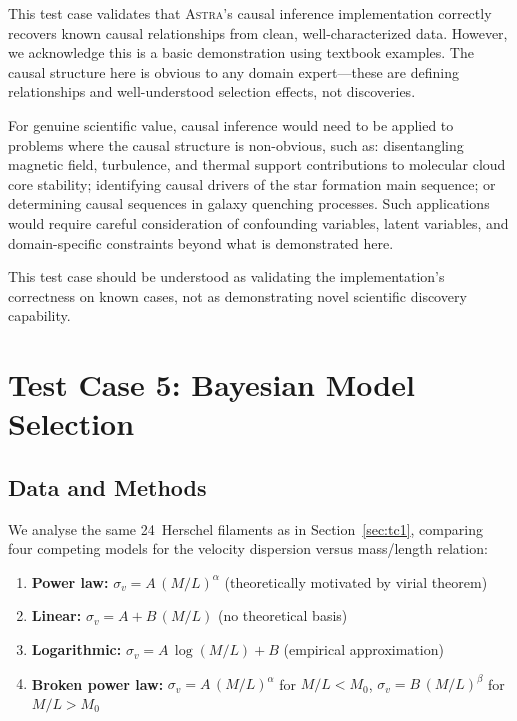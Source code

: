 \documentclass[fleqn,usenatbib]{mnras}
\newcommand{\astra}{\textsc{Astra}\xspace}
\begin{document}
This test case validates that \astra's causal inference implementation correctly recovers known causal relationships from clean, well-characterized data.
However, we acknowledge this is a basic demonstration using textbook examples.
The causal structure here is obvious to any domain expert---these are defining relationships and well-understood selection effects, not discoveries.

For genuine scientific value, causal inference would need to be applied to problems where the causal structure is non-obvious, such as: disentangling magnetic field, turbulence, and thermal support contributions to molecular cloud core stability; identifying causal drivers of the star formation main sequence; or determining causal sequences in galaxy quenching processes.
Such applications would require careful consideration of confounding variables, latent variables, and domain-specific constraints beyond what is demonstrated here.

This test case should be understood as validating the implementation's correctness on known cases, not as demonstrating novel scientific discovery capability.

\section{Test Case 5: Bayesian Model Selection}
\label{sec:tc5}

\subsection{Data and Methods}
\label{sec:tc5:data}

We analyse the same 24~Herschel filaments as in Section~\ref{sec:tc1}, comparing four competing models for the velocity dispersion versus mass/length relation:
\begin{enumerate}
  \item[(i)] \textbf{Power law:} $\sigma_v = A\,(M/L)^{\alpha}$ (theoretically motivated by virial theorem)
  \item[(ii)] \textbf{Linear:} $\sigma_v = A + B\,(M/L)$ (no theoretical basis)
  \item[(iii)] \textbf{Logarithmic:} $\sigma_v = A\,\log(M/L) + B$ (empirical approximation)
  \item[(iv)] \textbf{Broken power law:} $\sigma_v = A\,(M/L)^{\alpha}$ for $M/L < M_0$, $\sigma_v = B\,(M/L)^{\beta}$ for $M/L > M_0$
\end{enumerate}
\end{document}
